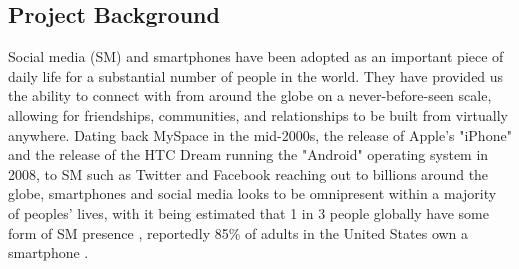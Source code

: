 \documentclass[12pt]{article}
\begin{document}
\subsection{Project Background}
Social media (SM) and smartphones 
have been adopted as an important piece of daily life for a substantial number of people in the world. 
They have provided us the ability to connect with from around the globe on a 
never-before-seen scale, allowing for friendships, communities, and relationships to be built from virtually 
anywhere. Dating back MySpace in the mid-2000s, the release of Apple's "iPhone" and the
release of the HTC Dream running the "Android" operating system in 2008, to SM such as Twitter and Facebook 
reaching out to billions around the globe, smartphones and social 
media looks to be omnipresent within a majority of peoples' lives, with it being estimated that 1 in 3 people 
globally have some form of SM presence \autocite{RefWorks:RefID:88-shah2021rise}, reportedly 85\% of 
adults in the United States own a smartphone \autocite{RefWorks:RefID:94-ouellette2022usefulness}.\newline


\end{document}
